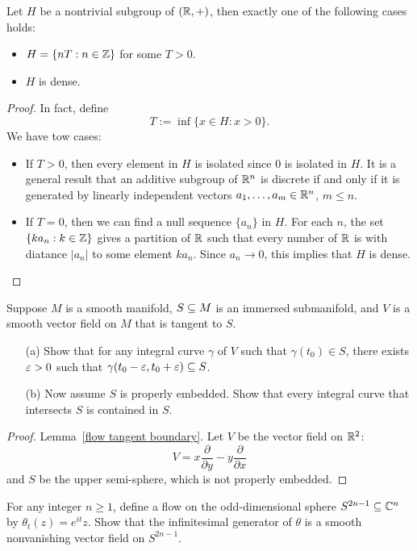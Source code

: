 \begin{lemma}
Let $H$ be a nontrivial subgroup of $(\mathbb{R},+)$, then exactly one of the following cases holds:
\begin{itemize}
\item $H=\{nT:n\in\mathbb{Z}\}$ for some $T>0$.
\item $H$ is dense.
\end{itemize}
\end{lemma}
\begin{proof}
In fact, define
\[T:=\inf\{x\in H:x>0\}.\]
We have tow cases:
\begin{itemize}
\item If $T>0$, then every element in $H$ is isolated since $0$ is isolated in $H$. It is a general result that an additive subgroup of $\mathbb{R}^n$ is discrete if and only if it is generated by linearly independent vectors $a_1,\dots,a_m\in\mathbb{R}^n$, $m\leq n$.
\item If $T=0$, then we can find a null sequence $\{a_n\}$ in $H$. For each $n$, the set $\{ka_n:k\in\mathbb{Z}\}$ gives a partition of $\mathbb{R}$ such that every number of $\mathbb{R}$ is with diatance $|a_n|$ to some element $ka_n$. Since $a_n\to 0$, this implies that $H$ is dense.
\end{itemize}
\end{proof}
\begin{exercise}\label{vector field tangent to submani}
Suppose $M$ is a smooth manifold, $S\subseteq M$ is an immersed submanifold, and $V$ is a smooth vector field on $M$ that is tangent to $S$.
\begin{itemize}
\item[(a)] Show that for any integral curve $\gamma$ of $V$ such that $\gamma(t_0)\in S$, there exists $\varepsilon>0$ such that $\gamma(t_0-\varepsilon,t_0+\varepsilon)\subseteq S$.
\item[(b)] Now assume $S$ is properly embedded. Show that every integral curve
that intersects $S$ is contained in $S$.
\end{itemize}
\end{exercise}
\begin{proof}
Lemma~\ref{flow tangent boundary}. Let $V$ be the vector field on $\mathbb{R}^2$:
\[V=x\frac{\partial}{\partial y}-y\frac{\partial}{\partial x}\]
and $S$ be the upper semi-sphere, which is not properly embedded.
\end{proof}
\begin{exercise}
For any integer $n\geq1$, define a flow on the odd-dimensional sphere $S^{2n-1}\subseteq\mathbb{C}^n$ by $\theta_t(z)=e^{it}z$. Show that the infinitesimal generator of $\theta$ is a smooth nonvanishing vector field on $S^{2n-1}$.
\end{exercise}
